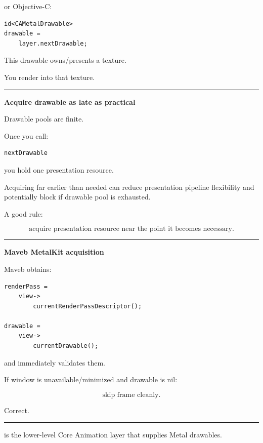 or Objective-C:

\begin{verbatim}
id<CAMetalDrawable>
drawable =
    layer.nextDrawable;
\end{verbatim}

This drawable owns/presents a texture.

You render into that texture.

\begin{center}\rule{0.5\linewidth}{0.5pt}\end{center}

\textbf{Acquire drawable as late as practical}

Drawable pools are finite.

Once you call:

\begin{verbatim}
nextDrawable
\end{verbatim}

you hold one presentation resource.

Acquiring far earlier than needed can reduce presentation pipeline flexibility and potentially block if drawable pool is exhausted.

A good rule:

\[
\boxed{
\text{acquire presentation resource near the point it becomes necessary}.
}
\]

\begin{center}\rule{0.5\linewidth}{0.5pt}\end{center}

\textbf{Maveb MetalKit acquisition}

Maveb obtains:

\begin{verbatim}
renderPass =
    view->
        currentRenderPassDescriptor();

drawable =
    view->
        currentDrawable();
\end{verbatim}

and immediately validates them.

If window is unavailable/minimized and drawable is nil:

\[
\boxed{
\text{skip frame cleanly}.
}
\]

Correct.

\begin{center}\rule{0.5\linewidth}{0.5pt}\end{center}

\textbf{}

 is the lower-level Core Animation layer that supplies Metal drawables.

